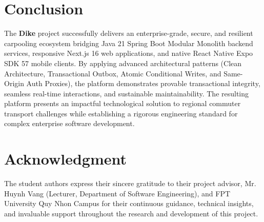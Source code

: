 \documentclass[conference,10pt,a4paper]{IEEEtran}
\begin{document}
\section{Conclusion}
The \textbf{Dike} project successfully delivers an enterprise-grade, secure, and resilient carpooling ecosystem bridging Java 21 Spring Boot Modular Monolith backend services, responsive Next.js 16 web applications, and native React Native Expo SDK 57 mobile clients. By applying advanced architectural patterns (Clean Architecture, Transactional Outbox, Atomic Conditional Writes, and Same-Origin Auth Proxies), the platform demonstrates provable transactional integrity, seamless real-time interactions, and sustainable maintainability. The resulting platform presents an impactful technological solution to regional commuter transport challenges while establishing a rigorous engineering standard for complex enterprise software development.

\section*{Acknowledgment}
The student authors express their sincere gratitude to their project advisor, Mr. Huynh Vang (Lecturer, Department of Software Engineering), and FPT University Quy Nhon Campus for their continuous guidance, technical insights, and invaluable support throughout the research and development of this project.
\end{document}

